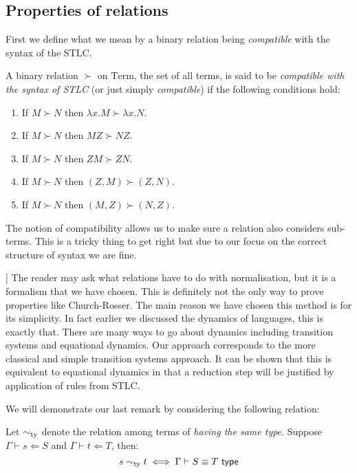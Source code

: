 \subsection{Properties of relations}

First we define what we mean by a binary relation being \emph{compatible} with the syntax of the STLC.
\begin{defin}
    A binary relation $\succ$ on $\mathrm{Term}$, the set of all terms, is said to be \emph{compatible with the syntax of STLC} (or just simply \emph{compatible}) if the following conditions hold:
    \begin{enumerate}
        \item If $M \succ N$ then $\lambda x . M \succ \lambda x . N$.
        \item If $M \succ N$ then $M Z \succ N Z$.
        \item If $M \succ N$ then $Z M \succ Z N$.
        \item If $M \succ N$ then $(Z,M) \succ (Z,N)$.
        \item If $M \succ N$ then $(M, Z) \succ (N, Z)$.
    \end{enumerate}
\end{defin}

\begin{remark}
    The notion of compatibility allows us to make sure a relation also considers sub-terms. This is a tricky thing to get right but due to our focus on the correct structure of syntax we are fine.
\end{remark}

\begin{remark}
[[CLEAN THIS UP]]
    The reader may ask what relations have to do with normalisation, but it is a formalism that we have chosen. This is definitely not the only way to prove properties like Church-Rosser. The main reason we have chosen this method is for its simplicity. In fact earlier we discussed the dynamics of languages, this is exactly that. There are many ways to go about dynamics including transition systems and equational dynamics. Our approach corresponds to the more classical and simple transition systems approach. It can be shown that this is equivalent to equational dynamics in that a reduction step will be justified by application of rules from STLC.
\end{remark}

We will demonstrate our last remark by considering the following relation:

\begin{defin}
    Let $\sim_{\mathrm{ty}}$ denote the relation among terms of \emph{having the same type}. Suppose $\Gamma \vdash s \Leftarrow S$ and $\Gamma \vdash t \Leftarrow T$, then:
    $$
        s \sim_{\mathrm{ty}} t \iff \Gamma \vdash S \equiv T \ \mathsf{type}
    $$
\end{defin}

